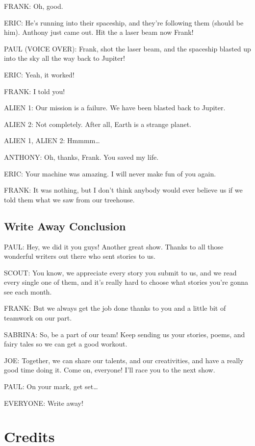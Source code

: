 FRANK:
Oh, good.

ERIC:
He's running into their spaceship, and they're following them (should be him).
Anthony just came out.
Hit the a laser beam now Frank!

PAUL (VOICE OVER):
Frank, shot the laser beam, and the spaceship blasted up into the sky all the way back to Jupiter!

ERIC:
Yeah, it worked!

FRANK:
I told you!

ALIEN 1:
Our mission is a failure.
We have been blasted back to Jupiter.

ALIEN 2:
Not completely.
After all, Earth is a strange planet.

ALIEN 1, ALIEN 2:
Hmmmm\dots

ANTHONY:
Oh, thanks, Frank.
You saved my life.

ERIC:
Your machine was amazing.
I will never make fun of you again.

FRANK:
It was nothing, but I don't think anybody would ever believe us if we told them what we saw from our treehouse.

\subsection{Write Away Conclusion}

PAUL:
Hey, we did it you guys!
Another great show.
Thanks to all those wonderful writers out there who sent stories to us.

SCOUT:
You know, we appreciate every story you submit to us, and we read every single one of them, and it's really hard to choose what stories you're gonna see each month.

FRANK:
But we always get the job done thanks to you and a little bit of teamwork on our part.

SABRINA:
So, be a part of our team!
Keep sending us your stories, poems, and fairy tales so we can get a good workout.

JOE:
Together, we can share our talents, and our creativities, and have a really good time doing it.
Come on, everyone!
I'll race you to the next show.

PAUL:
On your mark, get set\dots

EVERYONE:
Write away!

\section{Credits}